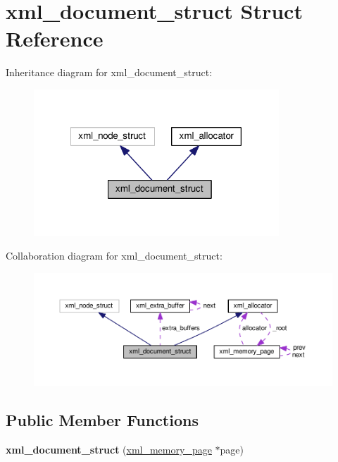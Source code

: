 \hypertarget{structxml__document__struct}{\section{xml\+\_\+document\+\_\+struct Struct Reference}
\label{structxml__document__struct}
}


Inheritance diagram for xml\+\_\+document\+\_\+struct\+:
\nopagebreak
\begin{figure}[H]
\begin{center}
\leavevmode
\includegraphics[width=261pt]{structxml__document__struct__inherit__graph}
\end{center}
\end{figure}


Collaboration diagram for xml\+\_\+document\+\_\+struct\+:
\nopagebreak
\begin{figure}[H]
\begin{center}
\leavevmode
\includegraphics[width=350pt]{structxml__document__struct__coll__graph}
\end{center}
\end{figure}
\subsection*{Public Member Functions}
\begin{DoxyCompactItemize}
\item 
\hypertarget{structxml__document__struct_aea3482436c20abd98ca063c3bd5dcfba}{{\bfseries xml\+\_\+document\+\_\+struct} (\hyperlink{structxml__memory__page}{xml\+\_\+memory\+\_\+page} $\ast$page)}\label{structxml__document__struct_aea3482436c20abd98ca063c3bd5dcfba}

\end{DoxyCompactItemize}
